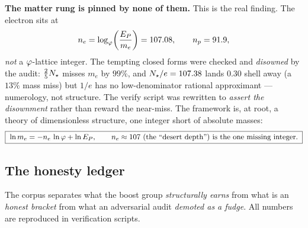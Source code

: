 \noindent\textbf{The matter rung is pinned by none of them.} This is the real finding. The electron sits at
\begin{equation}
n_e = \log_{\varphi}\!\left(\frac{E_{P}}{m_e}\right) = 107.08, \qquad n_p = 91.9,
\label{eq:scale:ne}
\end{equation}
\emph{not} a $\varphi$-lattice integer. The tempting closed forms were checked and \emph{disowned} by the audit: $\tfrac25N_{\star}$ misses $m_e$ by $99\%$, and $N_{\star}/e=107.38$ lands $0.30$ shell away (a $13\%$ mass miss) but $1/e$ has no low-denominator rational approximant --- numerology, not structure. The verify script was rewritten to \emph{assert the disownment} rather than reward the near-miss. The framework is, at root, a theory of dimensionless structure, one integer short of absolute masses:
\begin{equation}
\boxed{\;\ln m_e = -n_e\,\ln\varphi + \ln E_{P}, \qquad n_e\approx 107\ \text{(the ``desert depth'') is the one missing integer.}\;}
\label{eq:scale:desert}
\end{equation}

\subsection{The honesty ledger}

The corpus separates what the boost group \emph{structurally earns} from what is an \emph{honest bracket} from what an adversarial audit \emph{demoted as a fudge}. All numbers are reproduced in verification scripts.

